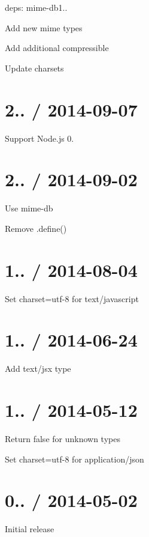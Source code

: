 \begin{DoxyItemize}
\item deps\+: mime-\/db1..
\begin{DoxyItemize}
\item Add new mime types
\item Add additional compressible
\item Update charsets
\end{DoxyItemize}
\end{DoxyItemize}

\section*{2.. / 2014-\/09-\/07 }


\begin{DoxyItemize}
\item Support Node.\+js 0.
\end{DoxyItemize}

\section*{2.. / 2014-\/09-\/02 }


\begin{DoxyItemize}
\item Use {\ttfamily mime-\/db}
\item Remove {\ttfamily .define()}
\end{DoxyItemize}

\section*{1.. / 2014-\/08-\/04 }


\begin{DoxyItemize}
\item Set charset=utf-\/8 for {\ttfamily text/javascript}
\end{DoxyItemize}

\section*{1.. / 2014-\/06-\/24 }


\begin{DoxyItemize}
\item Add {\ttfamily text/jsx} type
\end{DoxyItemize}

\section*{1.. / 2014-\/05-\/12 }


\begin{DoxyItemize}
\item Return {\ttfamily false} for unknown types
\item Set charset=utf-\/8 for {\ttfamily application/json}
\end{DoxyItemize}

\section*{0.. / 2014-\/05-\/02 }


\begin{DoxyItemize}
\item Initial release 
\end{DoxyItemize}